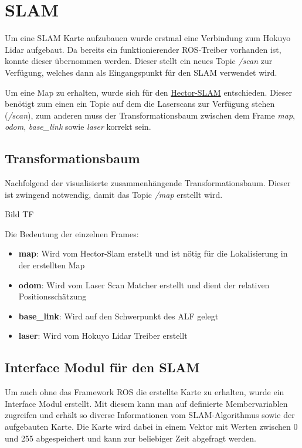 \section{SLAM}

Um eine SLAM Karte aufzubauen wurde erstmal eine Verbindung zum Hokuyo Lidar aufgebaut. Da bereits ein funktionierender ROS-Treiber vorhanden ist, konnte dieser übernommen werden. Dieser stellt ein neues Topic \textit{/scan} zur Verfügung, welches dann als Eingangspunkt für den SLAM verwendet wird. 

Um eine Map zu erhalten, wurde sich für den \href{http://wiki.ros.org/hector_mapping}{Hector-SLAM} entschieden. Dieser benötigt zum einen ein Topic auf dem die Laserscans zur Verfügung stehen (\textit{/scan}), zum anderen muss der Transformationsbaum zwischen dem Frame \textit{map}, \textit{odom}, \textit{base\_link} sowie \textit{laser} korrekt sein.  




\subsection{Transformationsbaum}

Nachfolgend der visualisierte zusammenhängende Transformationsbaum. Dieser ist zwingend notwendig, damit das Topic \textit{/map} erstellt wird. 

Bild TF

Die Bedeutung der einzelnen Frames:

\begin{itemize}
\item \textbf{map}: Wird vom Hector-Slam erstellt und ist nötig für die Lokalisierung in der erstellten Map
\item \textbf{odom}: Wird vom Laser Scan Matcher erstellt und dient der relativen Positionsschätzung
\item \textbf{base\_link}: Wird auf den Schwerpunkt des ALF gelegt
\item \textbf{laser}: Wird vom Hokuyo Lidar Treiber erstellt
\end{itemize}



\subsection{Interface Modul für den SLAM}

Um auch ohne das Framework ROS die erstellte Karte zu erhalten, wurde ein Interface Modul erstellt. Mit diesem kann man auf definierte Membervariablen zugreifen und erhält so diverse Informationen vom SLAM-Algorithmus sowie der aufgebauten Karte. Die Karte wird dabei in einem Vektor mit Werten zwischen 0 und 255 abgespeichert und kann zur beliebiger Zeit abgefragt werden. 













